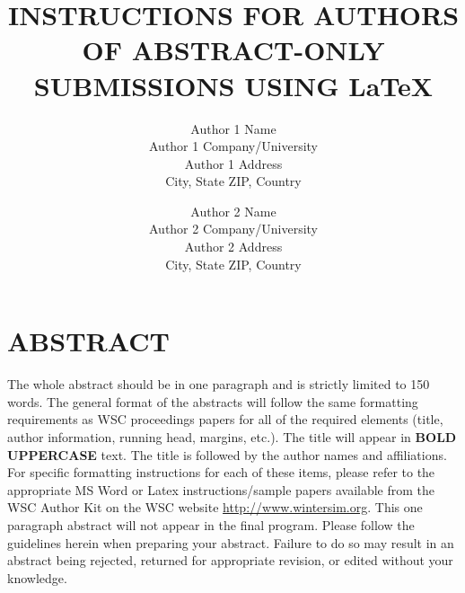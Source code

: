 \documentclass{wscposterproc}
\begin{document}
%
%
%

\title{INSTRUCTIONS FOR AUTHORS OF ABSTRACT-ONLY SUBMISSIONS USING \LaTeX}

\author{Author 1 Name\\[12pt]
Author 1 Company/University\\
Author 1 Address\\
City, State ZIP, Country\\
\and
Author 2 Name\\[12pt]
Author 2 Company/University\\
Author 2 Address\\
City, State ZIP, Country\\
}

\maketitle


\section*{ABSTRACT}

The whole abstract should be in one paragraph and is strictly limited to 150 words. The general format of the abstracts will follow the same formatting requirements as WSC proceedings papers for all of the required elements (title, author information, running head, margins, etc.). The title will appear in \textbf{BOLD UPPERCASE} text. The title is followed by the author names and affiliations. For specific formatting instructions for each of these items, please refer to the appropriate MS Word or Latex instructions/sample papers available from the WSC Author Kit on the WSC website \href{http://www.wintersim.org}{http://www.wintersim.org}. This one paragraph abstract will not appear in the final program. Please follow the guidelines herein when preparing your abstract. Failure to do so may result in an abstract being rejected, returned for appropriate revision, or edited without your knowledge.
\end{document}

